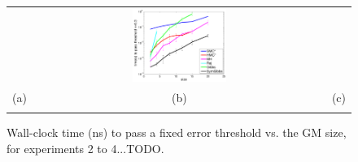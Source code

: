 \documentclass{article}
\newcommand{\nnn}{0.33}
\newcommand{\nnh}{0.23}
\begin{document}
{\begin{figure}[t!]
\begin{center}
\begin{tabular}{ccc}
& \hspace{-3mm} \includegraphics[width=\nnn\textwidth, height=\nnh\textwidth]{plotsx/collisionx/time_vs_param-errorbar.pdf}%
\vspace{-1.5mm}
\\
\hspace{-5mm} \footnotesize(a) 
& \hspace{-4mm} \footnotesize(b) 
& \hspace{-3mm} \footnotesize(c) \\
\multicolumn{3}{c}{}
\end{tabular}
\end{center}
\vspace{-8mm}
\caption{\footnotesize Wall-clock time (ns) to pass a fixed error threshold vs. the GM size, for experiments 2 to 4...TODO.}
\label{fig:mom2}
\vspace{-4mm}
\end{figure}


}
\end{document}
